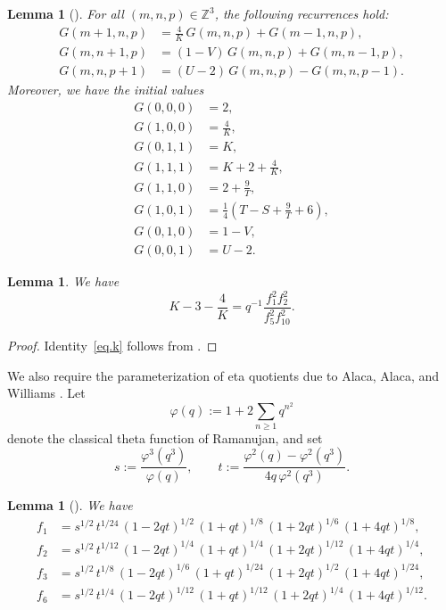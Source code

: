\documentclass{amsart}
\newtheorem{lemma}[theorem]{Lemma}
\theoremstyle{definition}
\begin{document}
\begin{lemma}[{\cite[Theorem~1.1]{PaudelSellersWang}}]\label{thm.P1main}
For all $(m,n,p)\in\mathbb{Z}^{3}$, the following recurrences hold:
\begin{align}
G(m+1,n,p)&=\frac4K\,G(m,n,p)+G(m-1,n,p),
\label{eq.recm}\\
G(m,n+1,p)&=(1-V)\,G(m,n,p)+G(m,n-1,p),
\label{eq.recn}\\
G(m,n,p+1)&=(U-2)\,G(m,n,p)-G(m,n,p-1).
\label{eq.recp}
\end{align}
Moreover, we have the initial values
\begin{align}
\label{eq.init0}G(0,0,0)&=2,\\
G(1,0,0)&=\frac4K,\\
G(0,1,1)&=K,\\
G(1,1,1)&=K+2+\frac4K,\\
G(1,1,0)&=2+\frac9T,\\
G(1,0,1)&=\frac14\left(T-S+\frac9T+6\right),\\
G(0,1,0)&=1-V,\\
G(0,0,1)&=U-2.
\label{eq.init1}
\end{align}
\end{lemma}


\begin{lemma} We have
\begin{equation}
  K-3-\dfrac4K =q^{-1}\dfrac{f_1^{2}f_2^{2}}{f_5^{2}f_{10}^{2}}. \label{eq.k}
\end{equation}
\end{lemma}
\begin{proof}
Identity~\eqref{eq.k} follows from \cite[Eqs.~(1.7) and~(2.2)]{Baruah-Begum}.
\end{proof}

We also require the parameterization of eta quotients due to Alaca, Alaca, and Williams \cite{AAW2006}. Let
\[
\varphi(q):=1+2\sum_{n\ge1}q^{n^{2}}
\]
denote the classical theta function of Ramanujan, and set
\begin{equation}\label{eq.stw}
s:=\frac{\varphi^{3}(q^{3})}{\varphi(q)},\qquad
t:=\frac{\varphi^{2}(q)-\varphi^{2}(q^{3})}{4q\,\varphi^{2}(q^{3})} .
\end{equation}

\begin{lemma}[{\cite{AAW2006}}]\label{lem.f1236}
We have
\begin{align}
\label{eq.aaw1}f_1&=s^{1/2}\,t^{1/24}\,(1-2qt)^{1/2}\,(1+qt)^{1/8}\,(1+2qt)^{1/6}\,(1+4qt)^{1/8},\\
\label{eq.aaw2}f_2&=s^{1/2}\,t^{1/12}\,(1-2qt)^{1/4}\,(1+qt)^{1/4}\,(1+2qt)^{1/12}\,(1+4qt)^{1/4},\\
\label{eq.aaw3}f_3&=s^{1/2}\,t^{1/8}\,(1-2qt)^{1/6}\,(1+qt)^{1/24}\,(1+2qt)^{1/2}\,(1+4qt)^{1/24},\\
\label{eq.aaw6}f_6&=s^{1/2}\,t^{1/4}\,(1-2qt)^{1/12}\,(1+qt)^{1/12}\,(1+2qt)^{1/4}\,(1+4qt)^{1/12}.
\end{align}
\end{lemma}
\end{document}
